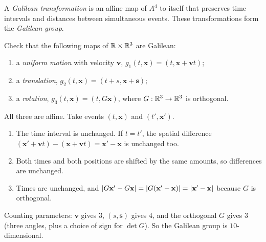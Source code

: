 \begin{definition}\label{def:galilean-group}
  A \emph{Galilean transformation} is an affine map of $A^4$ to itself that
  preserves time intervals and distances between simultaneous events. These
  transformations form the \emph{Galilean group}.
\end{definition}

\begin{exercise}\label{ex:galilean-examples}
  Check that the following maps of $\mathbb{R} \times \mathbb{R}^3$ are Galilean:
  \begin{enumerate}[label=(\alph*)]
    \item a \emph{uniform motion} with velocity $\mathbf v$,
      $g_1(t, \mathbf x) = (t, \mathbf x + \mathbf v t)$;
    \item a \emph{translation},
      $g_2(t, \mathbf x) = (t + s, \mathbf x + \mathbf s)$;
    \item a \emph{rotation}, $g_3(t, \mathbf x) = (t, G\mathbf x)$, where
      $G : \mathbb{R}^3 \to \mathbb{R}^3$ is orthogonal.
  \end{enumerate}
\end{exercise}

\begin{solution}
  All three are affine. Take events $(t, \mathbf x)$ and $(t', \mathbf x')$.
  \begin{enumerate}[label=(\alph*)]
    \item The time interval is unchanged. If $t = t'$, the spatial difference
      $(\mathbf x' + \mathbf v t) - (\mathbf x + \mathbf v t) = \mathbf x' - \mathbf x$
      is unchanged too.
    \item Both times and both positions are shifted by the same amounts, so
      differences are unchanged.
    \item Times are unchanged, and
      $\lvert G\mathbf x' - G\mathbf x\rvert = \lvert G(\mathbf x' - \mathbf x)\rvert = \lvert\mathbf x' - \mathbf x\rvert$
      because $G$ is orthogonal. \qedhere
  \end{enumerate}
\end{solution}



\begin{remark}
  Counting parameters: $\mathbf v$ gives $3$, $(s, \mathbf s)$ gives $4$,
  and the orthogonal $G$ gives $3$ (three angles, plus a choice of sign for
  $\det G$). So the Galilean group is $10$-dimensional.
\end{remark}

